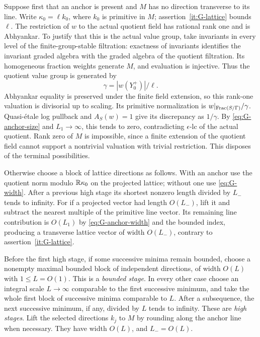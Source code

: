Suppose first that an anchor is present and $M$ has no direction
transverse to its line.  Write $\kappa_0=\ell k_0$, where $k_0$ is
primitive in $M$; assertion~\ref{it:G-lattice} bounds $\ell$.  The
restriction of $w$ to the actual quotient field has rational rank one
and is Abhyankar.  To justify that this is the actual value group, take
invariants in every level of the finite-group-stable filtration:
exactness of invariants identifies the invariant graded algebra with the
graded algebra of the quotient filtration.  Its homogeneous fraction
weights generate $M$, and evaluation is injective.  Thus the quotient
value group is generated by
\[
                         \gamma=|w(Y_0^+)|/\ell.
\]
Abhyankar equality is preserved under the finite field extension, so this
rank-one valuation is divisorial up to scaling.  Its primitive
normalization is $w|_{\operatorname{Frac}(S/\Gamma)}/\gamma$.  Quasi-\'etale log pullback
and $A_S(w)=1$ give its discrepancy as $1/\gamma$.  By
\eqref{eq:G-anchor-size} and $L_1\to\infty$, this tends to zero,
contradicting $\epsilon$-lc of the actual quotient.  Rank zero of $M$ is
impossible, since a finite extension of the quotient field cannot support
a nontrivial valuation with trivial restriction.  This disposes of the
terminal possibilities.

Otherwise choose a block of lattice directions as follows.  With an
anchor use the quotient norm modulo $\mathbb R\kappa_0$ on the projected
lattice; without one use \eqref{eq:G-width}.  After a previous high stage
its shortest nonzero length divided by $L_-$ tends to infinity.  For if a
projected vector had length $O(L_-)$, lift it and subtract the nearest
multiple of the primitive line vector.  Its remaining line contribution
is $O(L_1)$ by \eqref{eq:G-anchor-width} and the bounded index, producing
a transverse lattice vector of width $O(L_-)$, contrary to
assertion~\ref{it:G-lattice}.

Before the first high stage, if some successive minima remain bounded,
choose a nonempty maximal bounded block of independent directions,
of width $O(L)$ with $1\le L=O(1)$.  This is a \emph{bounded stage}.
In every other case choose an integral scale $L\to\infty$ comparable to
the first successive minimum, and take the whole first block of
successive minima comparable to $L$.  After a subsequence, the next
successive minimum, if any, divided by $L$ tends to infinity.  These are
\emph{high stages}.  Lift the selected directions $k_j$ to $M$ by rounding
along the anchor line when necessary.  They have width $O(L)$, and
$L_-=O(L)$.

